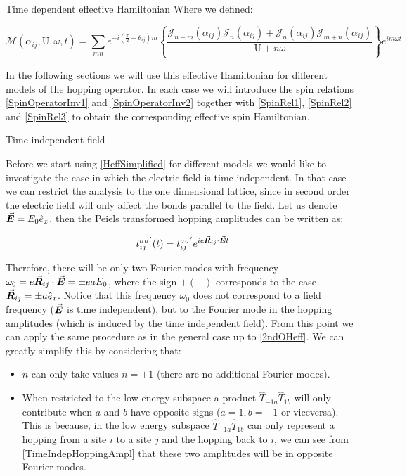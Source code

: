 \begin{section}{Time dependent effective Hamiltonian}
Where we defined:

\begin{equation}
\mathcal{M}(\alpha_{ij}, \text{U}, \omega, t) = \sum_{mn}e^{-i(\frac{\pi}{2}+\theta_{ij})m} \left\{ 
    \frac{\mathcal{J}_{n-m}(\alpha_{ij})\mathcal{J}_{n}(\alpha_{ij}) + \mathcal{J}_{n}(\alpha_{ij})\mathcal{J}_{m+n}(\alpha_{ij})}{\text{U}+n\omega} \right\}e^{im\omega t}
\end{equation}

In the following sections we will use this effective Hamiltonian for different models of the hopping operator. In each case we will introduce the spin relations \ref{SpinOperatorInv1} and \ref{SpinOperatorInv2} together with \ref{SpinRel1}, \ref{SpinRel2} and \ref{SpinRel3} to obtain the corresponding effective spin Hamiltonian. 

\begin{subsection}{Time independent field}

Before we start using \ref{HeffSimplified} for different models we would like to investigate the case in which the electric field is time independent. In that case we can restrict the analysis to the one dimensional lattice, since in second order the electric field will only affect the bonds parallel to the field. Let us denote $\vec{\boldsymbol{E}} = E_0 \hat{e}_x$, then the Peiels transformed hopping amplitudes can be written as:

\begin{equation}
\label{TimeIndepHoppingAmpl}
t_{ij}^{\sigma \sigma'} (t) = t_{ij}^{\sigma \sigma'} e^{ie \vec{\boldsymbol{R}}_{ij} \cdot \vec{\boldsymbol{E}} t}
\end{equation}

Therefore, there will be only two Fourier modes with frequency $\omega_0 = e \vec{\boldsymbol{R}}_{ij} \cdot \vec{\boldsymbol{E}} = \pm eaE_0$, where the sign $+(-)$ corresponds to the case $\vec{\boldsymbol{R}}_{ij} = \pm a \hat{e}_x$. Notice that this frequency $\omega_0$ does not correspond to a field frequency ($\vec{\boldsymbol{E}}$ is time independent), but to the Fourier mode in the hopping amplitudes (which is induced by the time independent field). From this point we can apply the same procedure as in the general case up to \ref{2ndOHeff}. We can greatly simplify this by considering that:
\begin{itemize}
	\item $n$ can only take values $ n = \pm 1$ (there are no additional Fourier modes).
	\item When restricted to the low energy subspace a product $\hat{T}_{-1 a} \hat{T}_{1 b}$ will only contribute when $a$ and $b$ have opposite signs ($a=1, b=-1$ or viceversa). This is because, in the low energy subspace $\hat{T}_{-1 a} \hat{T}_{1 b}$ can only represent a hopping from a site $i$ to a site $j$ and the hopping back to $i$, we can see from \ref{TimeIndepHoppingAmpl} that these two amplitudes will be in opposite Fourier modes.
\end{itemize}


\end{subsection}
\end{section}
